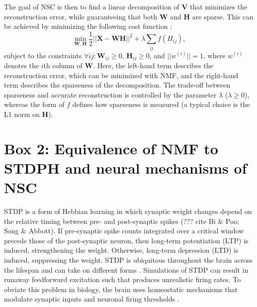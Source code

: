 The goal of \ac{NSC} is then to find a linear decomposition of \textbf{V}
that minimizes the reconstruction error,
while guaranteeing that both \textbf{W} and \textbf{H} are sparse.
This can be achieved by minimizing the following cost function
\citep{Hoyer2002}:
\begin{equation}
\min_{\mathbf{W}, \mathbf{H}} \frac{1}{2} ||\mathbf{X} -\mathbf{WH}||^2 + \lambda \sum_{ij} f(H_{ij}),
\end{equation}
subject to the constraints
$\forall ij: \mathbf{W}_{ij} \geq 0$, $\mathbf{H}_{ij} \geq 0$, and
$||w^{(i)}|| = 1$, where $w^{(i)}$ denotes the $i$th column of \textbf{W}.
Here, the left-hand term describes the reconstruction error, which can
be minimized with \ac{NMF},
and the right-hand term describes the sparseness of the decomposition.
The trade-off between sparseness and accurate reconstruction
is controlled by the parameter $\lambda$ ($\lambda \geq 0$), whereas
the form of $f$ defines how sparseness is measured
(a typical choice is the L1 norm on \textbf{H}).


\section{Box 2: Equivalence of NMF to STDPH and neural mechanisms of NSC}
\label{Box:NMFvSTDPH}

\Acf{STDP} is a form of Hebbian learning in which synaptic weight changes
depend on the relative timing between pre- and post-synaptic spikes (??? cite Bi \& Poo; Song \& Abbott). If pre-synaptic spike counts integrated over a critical window precede those of the post-synaptic neuron, then long-term potentiation (LTP) is induced, strengthening the weight. Otherwise, long-term depression (LTD) is induced, suppressing the weight. STDP is ubiquitous throughout the brain across the lifespan and can take on different forms \citep{Caporale2008STDP,Holtmaat2009STDP}. Simulations of \ac{STDP} can result in runaway feedforward excitation such that produces unrealistic firing rates. To obviate this problem in biology, the brain uses homeostatic mechanisms that modulate synaptic inputs and neuronal firing thresholds \citep{Watt2010}.


